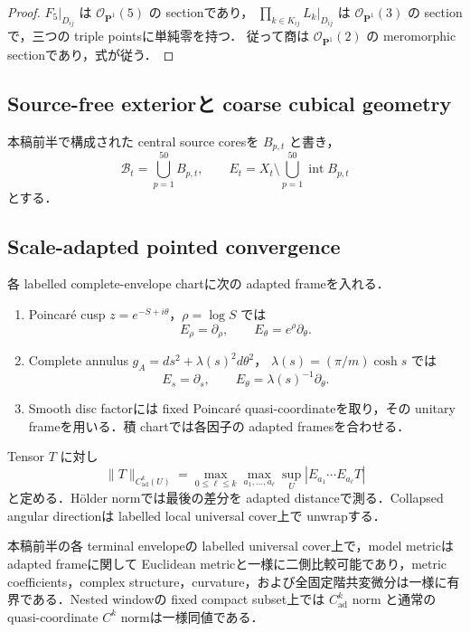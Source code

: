\documentclass[a4paper,11pt]{ltjsarticle}
\numberwithin{equation}{section}
\theoremstyle{plain}
\theoremstyle{definition}
\theoremstyle{remark}
\newcommand{\PP}{\mathbf P}\newcommand{\CC}{\mathbf C}\newcommand{\RR}{\mathbf R}\newcommand{\ZZ}{\mathbf Z}\newcommand{\NN}{\mathbf N}
\begin{document}
\begin{proof}
$F_5|_{D_{ij}}$ は $\mathcal O_{\PP^1}(5)$ の sectionであり，
$\prod_{k\in K_{ij}}L_k|_{D_{ij}}$ は $\mathcal O_{\PP^1}(3)$ の sectionで，三つの triple pointsに単純零を持つ．
従って商は $\mathcal O_{\PP^1}(2)$ の meromorphic sectionであり，式が従う．
\end{proof}

\subsection{Source-free exteriorと coarse cubical geometry}

本稿前半で構成された central source coresを $B_{p,t}$ と書き，
\[
 \mathcal B_t=\bigcup_{p=1}^{50}B_{p,t},\qquad
 E_t=X_t\setminus\bigcup_{p=1}^{50}\operatorname{int}B_{p,t}
\]
とする．

\subsection{Scale-adapted pointed convergence}

\begin{definition}\label{sharp:def:adapted-chart}
各 labelled complete-envelope chartに次の adapted frameを入れる．
\begin{enumerate}[label=\textup{(A\arabic*)}]
\item Poincar\'e cusp $z=e^{-S+i\theta}$，$\rho=\log S$ では
\[
 E_\rho=\partial_\rho,
 \qquad E_\theta=e^\rho\partial_\theta.
\]
\item Complete annulus
$g_A=ds^2+\lambda(s)^2d\theta^2$，
$\lambda(s)=(\pi/m)\cosh s$ では
\[
 E_s=\partial_s,
 \qquad E_\theta=\lambda(s)^{-1}\partial_\theta.
\]
\item Smooth disc factorには fixed Poincar\'e quasi-coordinateを取り，その unitary frameを用いる．積 chartでは各因子の adapted framesを合わせる．
\end{enumerate}
Tensor $T$ に対し
\begin{equation}\label{sharp:eq:Cad-definition}
 \|T\|_{C^k_{\mathrm{ad}}(U)}
 =\max_{0\le\ell\le k}
   \max_{a_1,\ldots,a_\ell}
   \sup_U |E_{a_1}\cdots E_{a_\ell}T|
\end{equation}
と定める．H\"older normでは最後の差分を adapted distanceで測る．Collapsed angular directionは labelled local universal cover上で unwrapする．
\end{definition}

\begin{lemma}\label{sharp:lem:adapted-bounded-geometry}
本稿前半の各 terminal envelopeの labelled universal cover上で，model metricは adapted frameに関して Euclidean metricと一様に二側比較可能であり，metric coefficients，complex structure，curvature，および全固定階共変微分は一様に有界である．Nested windowの fixed compact subset上では $C^k_{\mathrm{ad}}$ norm と通常の quasi-coordinate $C^k$ normは一様同値である．
\end{lemma}
\end{document}

